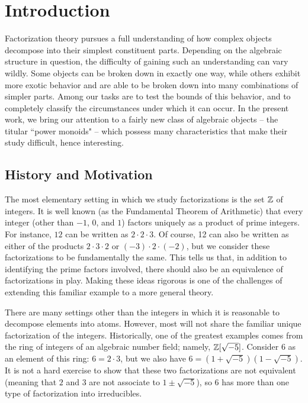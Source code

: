 \chapter{Introduction}

Factorization theory pursues a full understanding of how complex objects decompose into their simplest constituent parts.  
Depending on the algebraic structure in question, the difficulty of gaining such an understanding can vary wildly. 
Some objects can be broken down in exactly one way, while others exhibit more exotic behavior and are able to be broken down into many combinations of simpler parts.
Among our tasks are to test the bounds of this behavior, and to completely classify the circumstances under which it can occur.
In the present work, we bring our attention to a fairly new class of algebraic objects -- the titular ``power monoids" --  which possess many characteristics that make their study difficult, hence interesting.

\section{History and Motivation}

The most elementary setting in which we study factorizations is the set $\mathbb{Z}$ of integers.
It is well known (as the Fundamental Theorem of Arithmetic) that every integer (other than $-1$, $0$, and $1$) factors uniquely as a product of prime integers.
For instance, $12$ can be written as $2\cdot 2\cdot 3$.
Of course, 12 can also be written as either of the products $2\cdot 3\cdot 2$ or $(-3)\cdot 2\cdot (-2)$, but we consider these factorizations to be fundamentally the same.  
This tells us that, in addition to identifying the prime factors involved, there should also be an equivalence of factorizations in play.
Making these ideas rigorous is one of the challenges of extending this familiar example to a more general theory.


There are many settings other than the integers in which it is reasonable to decompose elements into atoms. 
However, most will not share the familiar unique factorization of the integers.  
Historically, one of the greatest examples comes from the ring of integers of an algebraic number field; namely, $\mathbb{Z}[\sqrt{-5}]$.
Consider $6$ as an element of this ring: $6=2\cdot3$, but we also have $6 = (1+\sqrt{-5})(1-\sqrt{-5})$.
It is not a hard exercise to show that these two factorizations are not equivalent (meaning that $2$ and $3$ are not associate to $1\pm\sqrt{-5}$), so $6$ has more than one type of factorization into irreducibles.

